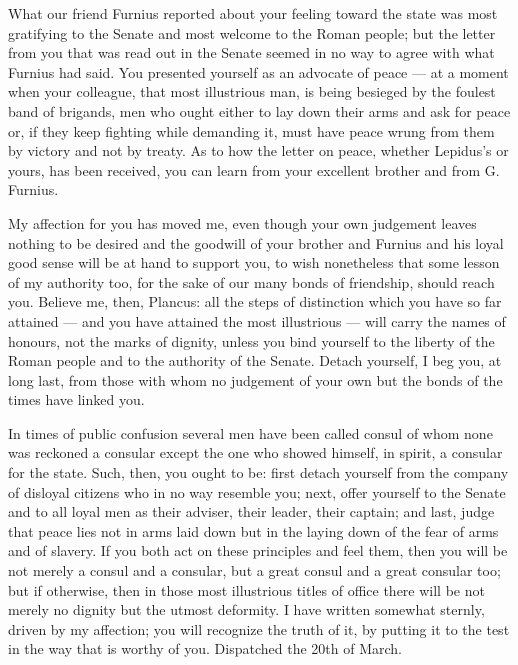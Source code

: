 

 What our friend Furnius reported about your feeling toward the state was most gratifying to the Senate and most welcome to the Roman people; but the letter from you that was read out in the Senate seemed in no way to agree with what Furnius had said. You presented yourself as an advocate of peace --- at a moment when your colleague, that most illustrious man, is being besieged by the foulest band of brigands, men who ought either to lay down their arms and ask for peace or, if they keep fighting while demanding it, must have peace wrung from them by victory and not by treaty. As to how the letter on peace, whether Lepidus's or yours, has been received, you can learn from your excellent brother and from G. Furnius.

 My affection for you has moved me, even though your own judgement leaves nothing to be desired and the goodwill of your brother and Furnius and his loyal good sense will be at hand to support you, to wish nonetheless that some lesson of my authority too, for the sake of our many bonds of friendship, should reach you. Believe me, then, Plancus: all the steps of distinction which you have so far attained --- and you have attained the most illustrious --- will carry the names of honours, not the marks of dignity, unless you bind yourself to the liberty of the Roman people and to the authority of the Senate. Detach yourself, I beg you, at long last, from those with whom no judgement of your own but the bonds of the times have linked you.

 In times of public confusion several men have been called consul of whom none was reckoned a consular except the one who showed himself, in spirit, a consular for the state. Such, then, you ought to be: first detach yourself from the company of disloyal citizens who in no way resemble you; next, offer yourself to the Senate and to all loyal men as their adviser, their leader, their captain; and last, judge that peace lies not in arms laid down but in the laying down of the fear of arms and of slavery. If you both act on these principles and feel them, then you will be not merely a consul and a consular, but a great consul and a great consular too; but if otherwise, then in those most illustrious titles of office there will be not merely no dignity but the utmost deformity. I have written somewhat sternly, driven by my affection; you will recognize the truth of it, by putting it to the test in the way that is worthy of you. Dispatched the 20th of March.
